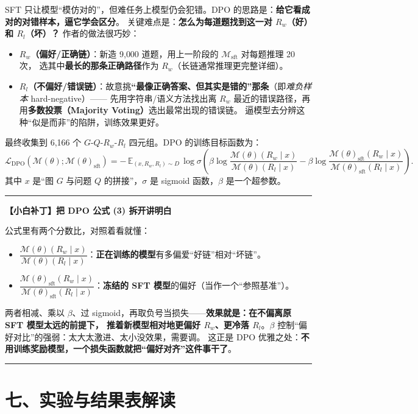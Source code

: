 \documentclass[11pt,UTF8,fontset=fandol]{ctexart}
\newenvironment{tip}[1]{%
  \par\smallskip\noindent\rule{\linewidth}{0.4pt}\par\nobreak
  \noindent\textbf{【小白补丁】#1}\par\nobreak\noindent\ignorespaces
}{%
  \par\noindent\rule{\linewidth}{0.4pt}\par\smallskip
}
\begin{document}
SFT 只让模型“模仿对的”，但难任务上模型仍会犯错。DPO 的思路是：\textbf{给它看成对的对错样本，逼它学会区分}。
关键难点是：\textbf{怎么为每道题找到这一对 $R_w$（好）和 $R_l$（坏）？} 作者的做法很巧妙：
\begin{itemize}[leftmargin=2em]
  \item \textbf{$R_w$（偏好/正确链）}：新造 9{,}000 道题，用上一阶段的 $\mathcal{M}_{\mathrm{sft}}$ 对每题推理 20 次，
        选其中\textbf{最长的那条正确路径}作为 $R_w$（长链通常推理更完整详细）。
  \item \textbf{$R_l$（不偏好/错误链）}：故意挑\textbf{“最像正确答案、但其实是错的”那条}（即\emph{难负样本} hard-negative）——
        先用字符串/语义方法找出离 $R_w$ 最近的错误路径，再用\textbf{多数投票（Majority Voting）}选出最常出现的错误链。
        逼模型去分辨这种“似是而非”的陷阱，训练效果更好。
\end{itemize}
最终收集到 6{,}166 个 $G$-$Q$-$R_w$-$R_l$ 四元组。DPO 的训练目标函数为：
\begin{equation*}
  \mathcal{L}_{\mathrm{DPO}}\!\left(\mathcal{M}(\theta);\mathcal{M}(\theta)_{\mathrm{sft}}\right)
  = -\,\mathbb{E}_{(x,R_w,R_l)\sim D}\,
  \log\sigma\!\left(\beta\log\frac{\mathcal{M}(\theta)(R_w\mid x)}{\mathcal{M}(\theta)(R_l\mid x)}
  -\beta\log\frac{\mathcal{M}(\theta)_{\mathrm{sft}}(R_w\mid x)}{\mathcal{M}(\theta)_{\mathrm{sft}}(R_l\mid x)}\right). \tag{3}
\end{equation*}
其中 $x$ 是“图 $G$ 与问题 $Q$ 的拼接”，$\sigma$ 是 sigmoid 函数，$\beta$ 是一个超参数。

\begin{tip}{把 DPO 公式 (3) 拆开讲明白}
公式里有两个分数比，对照着看就懂：
\begin{itemize}[leftmargin=1.5em]
  \item $\dfrac{\mathcal{M}(\theta)(R_w\mid x)}{\mathcal{M}(\theta)(R_l\mid x)}$：\textbf{正在训练的模型}有多偏爱“好链”相对“坏链”。
  \item $\dfrac{\mathcal{M}(\theta)_{\mathrm{sft}}(R_w\mid x)}{\mathcal{M}(\theta)_{\mathrm{sft}}(R_l\mid x)}$：\textbf{冻结的 SFT 模型}的偏好（当作一个“参照基准”）。
\end{itemize}
两者相减、乘以 $\beta$、过 sigmoid，再取负号当损失——\textbf{效果就是：在不偏离原 SFT 模型太远的前提下，
推着新模型相对地更偏好 $R_w$、更冷落 $R_l$}。$\beta$ 控制“偏好对比”的强弱：太大太激进、太小没效果，需要调。
这正是 DPO 优雅之处：\textbf{不用训练奖励模型，一个损失函数就把“偏好对齐”这件事干了}。
\end{tip}

\section{七、实验与结果表解读}
\end{document}
